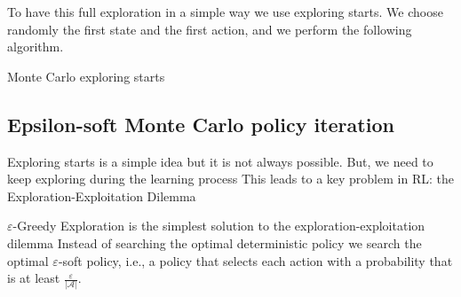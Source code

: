 To have this full exploration in a simple way we use exploring starts. 
We choose randomly the first state and the first action, and we perform the following algorithm. 
\begin{algorithm}[H]
    \caption{Monte Carlo exploring starts}
        \begin{algorithmic}[1]
        \end{algorithmic}
\end{algorithm}

\subsection{Epsilon-soft Monte Carlo policy iteration}
Exploring starts is a simple idea but it is not always possible. 
But, we need to keep exploring during the learning process
This leads to a key problem in RL: the Exploration-Exploitation Dilemma


$\varepsilon$-Greedy Exploration is the simplest solution to the exploration-exploitation dilemma
Instead of searching the optimal deterministic policy we search the optimal $\varepsilon$-soft
policy, i.e., a policy that selects each action with a probability that is at least $\frac{\varepsilon}{\left\lvert \mathcal{A}\right\rvert}$. 

